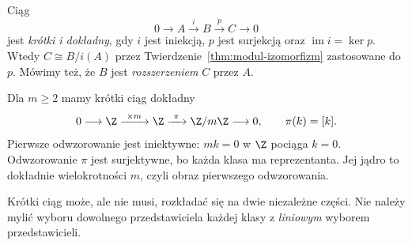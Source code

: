 \begin{definicja}
\label{def:krotki-ciag}
Ciąg
\begin{equation}\label{eq:krotki-ciag}
 0\longrightarrow A\xrightarrow{i}B
   \xrightarrow{p}C\longrightarrow0
\end{equation}
jest \emph{krótki i dokładny}, gdy $i$ jest
iniekcją, $p$ jest surjekcją oraz
$\operatorname{im}i=\ker p$.
Wtedy $C\cong B/i(A)$ przez
Twierdzenie~\ref{thm:modul-izomorfizm}
zastosowane do $p$. Mówimy też,
że $B$ jest \emph{rozszerzeniem} $C$ przez $A$.
\end{definicja}

\begin{przyklad}
\label{prz:ses-mod-m}
Dla $m\geq2$ mamy krótki ciąg dokładny
\[
 0\longrightarrow\Z\xrightarrow{\ \times m\ }\Z
   \xrightarrow{\ \pi\ }\Z/m\Z\longrightarrow0,
 \qquad \pi(k)=[k].
\]
Pierwsze odwzorowanie jest iniektywne: $mk=0$
w $\Z$ pociąga $k=0$. Odwzorowanie $\pi$ jest
surjektywne, bo każda klasa ma reprezentanta.
Jej jądro to dokładnie wielokrotności $m$,
czyli obraz pierwszego odwzorowania.
\end{przyklad}

Krótki ciąg może, ale nie musi, rozkładać się
na dwie niezależne części. Nie należy mylić
wyboru dowolnego przedstawiciela każdej klasy
z \emph{liniowym} wyborem przedstawicieli.

